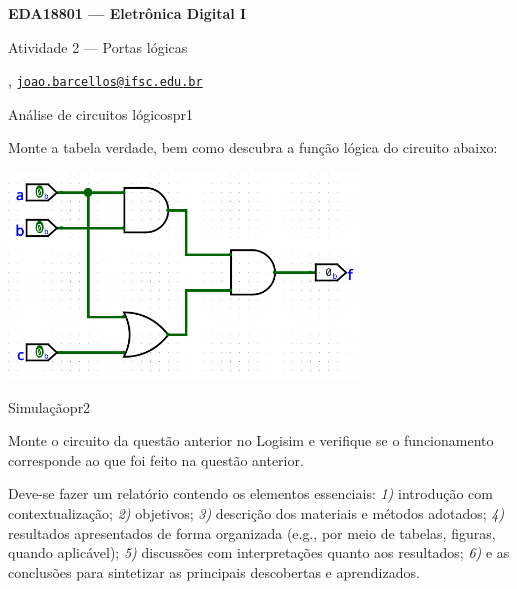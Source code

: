 





\begin{Large}
    \textbf{EDA18801 --- Eletrônica Digital I}
    
    Atividade 2 --- Portas lógicas \hfill {}
\end{Large}

\vspace{1ex}
\textbf{} , \href{mailto:joao.barcellos@ifsc.edu.br}{\texttt{joao.barcellos@ifsc.edu.br}}\\
\textbf{}

\vspace{2ex}

\begin{problem}{Análise de circuitos lógicos}{pr1}

Monte a tabela verdade, bem como descubra a função lógica do circuito abaixo: \\
    
\begin{center}
    \includegraphics[width=0.7\textwidth]{./figures/circuito_logico_logisim.png}
\end{center}

\end{problem}

\begin{problem}{Simulação}{pr2}

Monte o circuito da questão anterior no Logisim e verifique se o funcionamento corresponde ao que foi feito na questão anterior. \\

\end{problem}

\begin{obs}

Deve-se fazer um relatório contendo os elementos essenciais: \textit{1)} introdução com contextualização; \textit{2)} objetivos; \textit{3)} descrição dos materiais e métodos adotados; \textit{4)} resultados apresentados de forma organizada (e.g., por meio de tabelas, figuras, quando aplicável); \textit{5)} discussões com interpretações quanto aos resultados; \textit{6)} e as conclusões para sintetizar as principais descobertas e aprendizados.

\end{obs}

\newpage

\printbibliography


